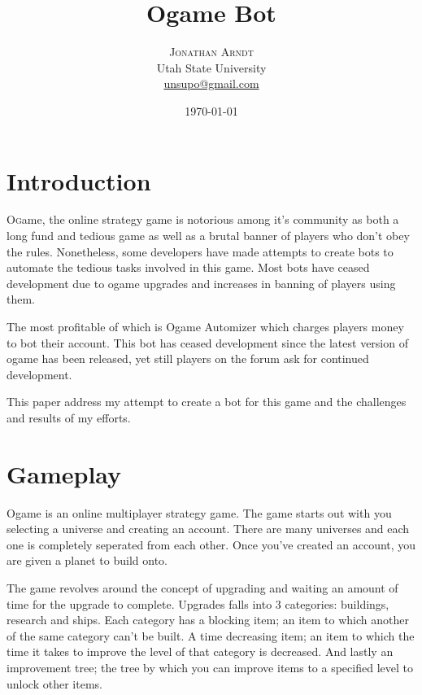 \documentclass[twoside,twocolumn]{article}
\title{Ogame Bot} %
\author{%
\textsc{Jonathan Arndt}\\%
\normalsize Utah State University\\ %
\normalsize \href{mailto:unsupo@gmail.com}{unsupo@gmail.com} %
}
\date{\today} %
\begin{document}
\maketitle


\section{Introduction}
\lettrine[nindent=0em,lines=3]{O}game, the online strategy game is notorious
among it's community as both a long fund and tedious game as well as a brutal
banner of players who don't obey the rules.  Nonetheless, some developers
have made attempts to create bots to automate the tedious tasks involved in this
game.  Most bots have ceased development due to ogame upgrades and increases in
banning of players using them.

The most profitable of which is Ogame Automizer which charges players money to
bot their account.  This bot has ceased development since the latest version of
ogame has been released, yet still players on the forum ask for continued development.

This paper address my attempt to create a bot for this game and the challenges
and results of my efforts.


\section{Gameplay}
Ogame is an online multiplayer strategy game.
The game starts out with you selecting a universe and creating an account.
There are many universes and each one is completely seperated from each other.
Once you've created an account, you are given a planet to build onto.

The game revolves around the concept of upgrading and waiting an amount of time
for the upgrade to complete.  Upgrades falls into 3 categories: buildings, research
and ships.  Each category has a blocking item; an item to which another
of the same category can't be built. A time decreasing item; an item to which
the time it takes to improve the level of that category is decreased.  And lastly
an improvement tree; the tree by which you can improve items to a specified level
to unlock other items.
\end{document}
